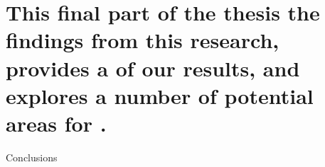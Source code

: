 
\newcommand{\partheaderimage}{figures/p4-header}
\part[Conclusions]{This final part of the thesis  the findings from this research, provides a  of our results, and explores a number of potential areas for .}{Conclusions}\label{part:conclusions}
